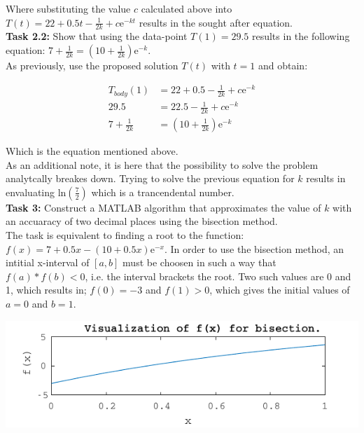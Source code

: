 \documentclass{article}
\begin{document}
  \noindent
  Where substituting the value $c$ calculated above into
  $T(t) = 22 + 0.5t - \frac{1}{2k} + c\mathrm{e}^{-kt}$
  results in the sought after equation. \\

  \noindent
  \textbf{Task 2.2:}
  Show that using the data-point $T(1) = 29.5$ results in the following
  equation:
  $ 7 + \frac{1}{2k} = (10 + \frac{1}{2k})\mathrm{e}^{-k} $. \\

  \noindent
  As previously, use the proposed solution $T(t)$ with $t=1$ and obtain:

  \begin{align*}
    T_{body}(1) &= 22 + 0.5 - \frac{1}{2k} + c\mathrm{e}^{-k} \\
    29.5 &= 22.5 - \frac{1}{2k} + c\mathrm{e}^{-k} \\
    7 + \frac{1}{2k} &= (10 + \frac{1}{2k})\mathrm{e}^{-k}
  \end{align*}

  \noindent
  Which is the equation mentioned above. \\

  \noindent
  As an additional note, it is here that the possibility to solve the problem
  analytcally breakes down. Trying to solve the previous equation for $k$
  results in envaluating $\mathrm{ln}(\frac{7}{2})$ which is a trancendental
  number. \\

  \noindent
  \textbf{Task 3:}
  Construct a MATLAB algorithm that approximates the value of $k$ with an
  accuaracy of two decimal places using the bisection method. \\

  \noindent
  The task is equivalent to finding a root to the function:
  $ f(x) = 7 + 0.5x - (10 + 0.5x)\mathrm{e}^{-x} $.
  In order to use the bisection method, an intitial x-interval of $[a, b]$ must
  be choosen in such a way that $f(a) * f(b) < 0$, i.e. the interval brackets the
  root. Two such values are 0 and 1, which results in; $f(0) = -3$ and $f(1) >
  0$, which gives the initial values of $a=0$ and $b=1$.

  \begin{center}
    \includegraphics{figs/t3_check.pdf}
  \end{center}
\end{document}
